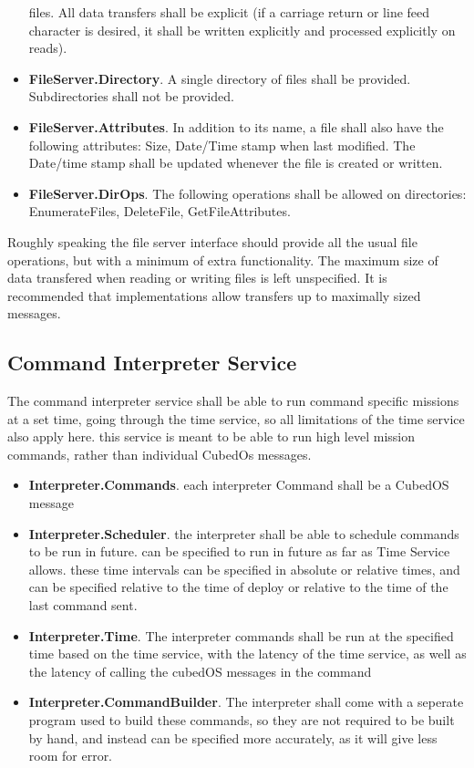 \begin{itemize}
  files. All data transfers shall be explicit (if a carriage return or line feed character is
  desired, it shall be written explicitly and processed explicitly on reads).
\item \textbf{FileServer.Directory}. A single directory of files shall be provided.
  Subdirectories shall not be provided.
\item \textbf{FileServer.Attributes}. In addition to its name, a file shall also have the
  following attributes: Size, Date/Time stamp when last modified. The Date/time stamp shall be
  updated whenever the file is created or written.
\item \textbf{FileServer.DirOps}. The following operations shall be allowed on directories:
  EnumerateFiles, DeleteFile, GetFileAttributes.
\end{itemize}

Roughly speaking the file server interface should provide all the usual file operations, but
with a minimum of extra functionality. The maximum size of data transfered when reading or
writing files is left unspecified. It is recommended that implementations allow transfers up to
maximally sized messages.


\subsection{Command Interpreter Service}
\label{sec:command-interpreter-service}

The command interpreter service shall be able to run command specific missions at a set time,
going through the time service, so all limitations of the time service also apply here. this
service is meant to be able to run high level mission commands, rather than individual CubedOs
messages.


\begin{itemize}
\item \textbf{Interpreter.Commands}. each interpreter Command shall be a CubedOS message
\item \textbf{Interpreter.Scheduler}. the interpreter shall be able to schedule commands to be
	run in future. can be specified to run in future as far as Time Service allows. these
time intervals can be specified in absolute or relative times, and can be specified relative to
the time of deploy or relative to the time of the last command sent. 
\item \textbf{Interpreter.Time}. The interpreter commands shall be run at the specified time
	based on the time service, with the latency of the time service, as well as the latency
	of calling the cubedOS messages in the command
\item \textbf{Interpreter.CommandBuilder}. The interpreter shall come with a seperate program
used to build these commands, so they are not required to be built by hand, and instead can be
specified more accurately, as it will give less room for error.

\end{itemize}

